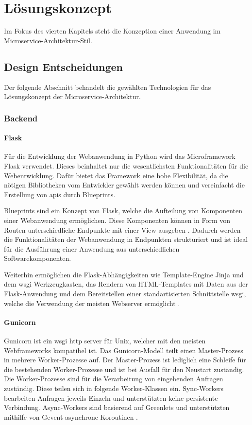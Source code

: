 \chapter{Lösungskonzept}
Im Fokus des vierten Kapitels steht die Konzeption einer Anwendung im Microservice-Architektur-Stil.

\section{Design Entscheidungen}

Der folgende Abschnitt behandelt die gewählten Technologien für das Lösungskonzept der Microservice-Architektur.

\subsection{Backend}

\subsubsection{Flask}
Für die Entwicklung der Webanwendung in Python wird das Microframework Flask verwendet.
Dieses beinhaltet nur die wesentlichsten Funktionalitäten für die Webentwicklung.
Dafür bietet das Framework eine hohe Flexibilität, da die nötigen Bibliotheken vom Entwickler gewählt werden können \cite{flaskdocu} und
vereinfacht die Erstellung von \acs{api}s \cite[S.11]{restfulpython} durch Blueprints.

Blueprints sind ein Konzept von Flask, welche die Aufteilung von Komponenten einer Webanwendung ermöglichen.
Diese Komponenten können in Form von Routen unterschiedliche Endpunkte mit einer View ausgeben \cite{flaskdocu}.
Dadurch werden die Funktionalitäten der Webanwendung in Endpunkten strukturiert und ist ideal für die Ausführung einer Anwendung aus unterschiedlichen Softwarekomponenten.

Weiterhin ermöglichen die Flask-Abhängigkeiten wie Template-Engine Jinja und dem \acs{wsgi} Werkzeugkasten,
das Rendern von HTML-Templates mit Daten aus der Flask-Anwendung
und dem Bereitstellen einer standartisierten Schnittstelle \ac{wsgi}, welche die Verwendung der meisten Webserver ermöglicht \cite{flaskdocu}.


\subsubsection{Gunicorn}
Gunicorn ist ein \acs{wsgi} \acs{http} server für Unix, welcher mit den meisten Webframeworks kompatibel ist.
Das Gunicorn-Modell teilt einen Master-Prozess in mehrere Worker-Prozesse auf.
Der Master-Prozess ist lediglich eine Schleife für die bestehenden Worker-Prozesse
und ist bei Ausfall für den Neustart zuständig.
Die Worker-Prozesse sind für die Verarbeitung von eingehenden Anfragen zuständig.
Diese teilen sich in folgende Worker-Klassen ein. 
Sync-Workers bearbeiten Anfragen jeweils Einzeln und unterstützten keine persistente Verbindung.
Async-Workers sind basierend auf Greenlets und unterstützten mithilfe von Gevent asynchrone Koroutinen \cite{gunciorndocs}. 


